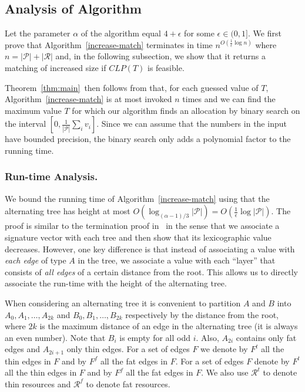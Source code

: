 \documentclass{llncs}
\newcommand{\res}{\ensuremath{\mathcal{R}}\xspace}
\newcommand{\players}{\ensuremath{\mathcal{P}}\xspace}
\begin{document}
\subsection{Analysis of Algorithm}

\label{sec:algoanal}

Let the parameter $\alpha$ of the algorithm equal $4+\epsilon$ for some
$\epsilon\in (0, 1]$. We first prove that Algorithm~\ref{increase-match} terminates in
time $n^{O\left(\frac{1}{\epsilon}\log n\right)}$ where $n=|\players| + |\res|$
and, in the following subsection, we show that it returns a matching of
increased size if $CLP(T)$ is feasible.

Theorem~\ref{thm:main}~then follows from that, for each guessed value of $T$,
Algorithm~\ref{increase-match} is at most invoked $n$ times and we can find the
maximum value $T$ for which our algorithm finds an allocation by binary search
on the interval $[0, \frac{1}{|\players|}\sum_i v_i]$. Since we can assume that the numbers in the
input have bounded precision, the binary search only adds a polynomial factor to
the running time.

\subsubsection{Run-time Analysis.}
We bound the running time of Algorithm~\ref{increase-match} using that
the alternating tree has height at most
$O(\log_{(\alpha-1)/3}|\players|) = O\left(\frac{1}{\epsilon} \log
|\players|\right)$. The proof is similar to the termination proof
in~\cite{AFS08} in the sense that we associate a signature vector with
each tree and then show that its lexicographic value
decreases. However, one key difference is that instead of associating a
value with \emph{each edge} of type $A$ in the tree, we associate a
value with each ``layer'' that consists of \emph{all edges} of a certain
distance from the root. This allows us to directly associate the
run-time with the height of the alternating tree.

When considering an alternating tree it is convenient to partition $A$ and $B$
into $A_0, A_1, \dots, A_{2k}$ and $B_0, B_1, \dots, B_{2k}$ respectively by the
distance from the root, where $2k$ is the maximum distance of an edge in the
alternating tree (it is always an even number). Note that $B_i$ is empty for all
odd $i$. Also, $A_{2i}$ contains only fat edges and $A_{2i+1}$ only thin edges.
For a set of edges $F$ we denote by $F^t$ all the thin edges in $F$ and by $F^f$
all the fat edges in $F$.  For a set of edges $F$ denote by $F^t$ all the thin
edges in $F$ and by $F^f$ all the fat edges in $F$. We also use $\res^t$ to
denote thin resources and $\res^f$ to denote fat resources.
\end{document}
